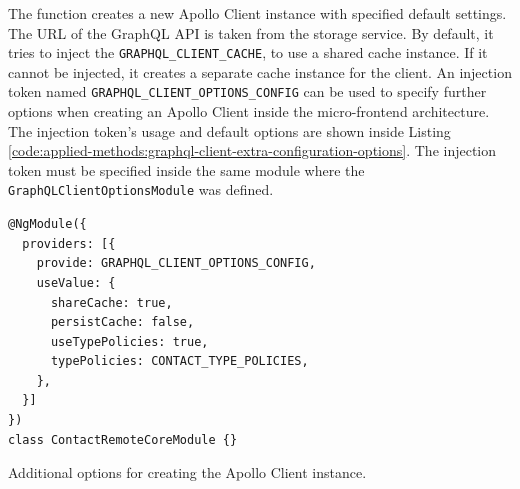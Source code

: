 \noindent The function creates a new Apollo Client instance with specified default settings. The \ac{URL} of the GraphQL \ac{API} is taken from the storage service. By default, it tries to inject the \texttt{GRAPHQL\_CLIENT\_CACHE}, to use a shared cache instance. If it cannot be injected, it creates a separate cache instance for the client. An injection token named \texttt{GRAPHQL\_CLIENT\_OPTIONS\_CONFIG} can be used to specify further options when creating an Apollo Client inside the micro-frontend architecture. The injection token's usage and default options are shown inside Listing \ref{code:applied-methods:graphql-client-extra-configuration-options}. The injection token must be specified inside the same module where the \texttt{GraphQLClientOptionsModule} was defined.

\ifshowListings
\begin{listing}[H]
\begin{verbatim}
@NgModule({
  providers: [{
    provide: GRAPHQL_CLIENT_OPTIONS_CONFIG,
    useValue: {
      shareCache: true,
      persistCache: false,
      useTypePolicies: true,
      typePolicies: CONTACT_TYPE_POLICIES,
    },
  }]
})
class ContactRemoteCoreModule {}
\end{verbatim}
\caption{Additional options for creating the Apollo Client instance.}\label{code:applied-methods:graphql-client-extra-configuration-options}
\end{listing}
\fi

